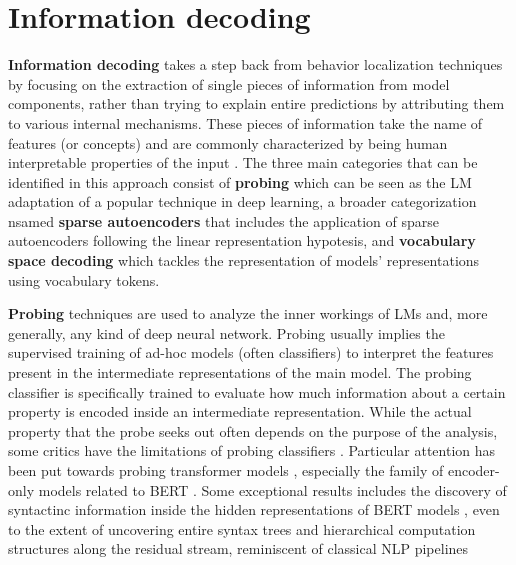 
\section{Information decoding}

\textbf{Information decoding} takes a step back from behavior localization techniques by focusing on the extraction of single pieces of information from model components, rather than trying to explain entire predictions by attributing them to various internal mechanisms.
These pieces of information take the name of features (or concepts) and are commonly characterized by being human interpretable properties of the input .
The three main categories that can be identified in this approach consist of \textbf{probing} which can be seen as the LM adaptation of a popular technique in deep learning, a broader categorization nsamed \textbf{sparse autoencoders} that includes the application of sparse autoencoders following the linear representation hypotesis, and \textbf{vocabulary space decoding} which tackles the representation of models' representations using vocabulary tokens.

\textbf{Probing} techniques are used to analyze the inner workings of LMs and, more generally, any kind of deep neural network.
Probing usually implies the supervised training of ad-hoc models (often classifiers) to interpret the features present in the intermediate representations of the main model.
The probing classifier is specifically trained to evaluate how much information about a certain property is encoded inside an intermediate representation.
While the actual property that the probe seeks out often depends on the purpose of the analysis, some critics have  the limitations of probing classifiers .
Particular attention has been put towards probing transformer models , especially the family of encoder-only models related to BERT .
Some exceptional results includes the discovery of syntactinc information inside the hidden representations of BERT models , even to the extent of uncovering entire syntax trees  and hierarchical computation structures along the residual stream, reminiscent of classical NLP pipelines 


